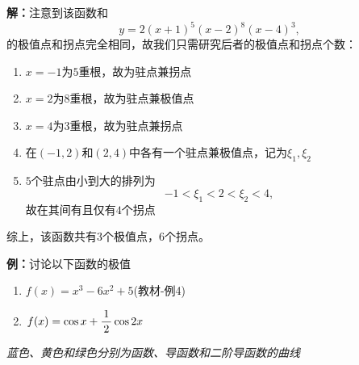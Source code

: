 \begin{shaded}
	{\bf 解：}注意到该函数和
	$$y=2(x+1)^5(x-2)^8(x-4)^3,$$
	的极值点和拐点完全相同，故我们只需研究后者的极值点和拐点个数：
	\begin{enumerate}[(1)]
  	  \setlength{\itemindent}{1cm}
	  \item $x=-1$为$5$重根，故为驻点兼拐点
	  \item $x=2$为$8$重根，故为驻点兼极值点
	  \item $x=4$为$3$重根，故为驻点兼拐点
	  \item 在$(-1,2)$和$(2,4)$中各有一个驻点兼极值点，记为$\xi_1,\xi_2$
	  \item $5$个驻点由小到大的排列为
	  $$-1<\xi_1<2<\xi_2<4,$$
	  故在其间有且仅有$4$个拐点
	\end{enumerate}
	
	综上，该函数共有$3$个极值点，$6$个拐点。
	
\end{shaded}

{\bf 例：}讨论以下函数的极值
\begin{enumerate}[(1)]
  \setlength{\itemindent}{1cm}
  \item $f(x)=x^3-6x^2+5$\hfill (教材-例4)
  \item $f(x)=\cos x+\displaystyle\frac{\,{1}\,}{\,{2}\,}\cos 2x$
\end{enumerate}

\begin{center}
	\quad
	
	{\it 蓝色、黄色和绿色分别为函数、导函数和二阶导函数的曲线}
\end{center}

